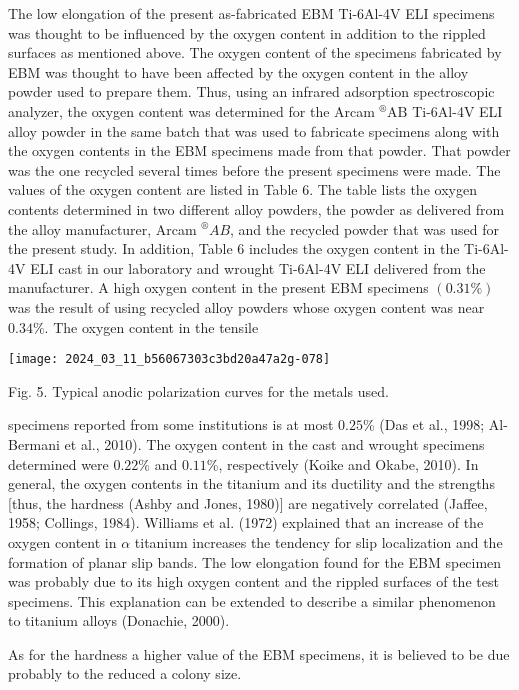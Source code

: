 \documentclass[10pt]{article}
\begin{document}
The low elongation of the present as-fabricated EBM Ti-6Al-4V ELI specimens was thought to be influenced by the oxygen content in addition to the rippled surfaces as mentioned above. The oxygen content of the specimens fabricated by EBM was thought to have been affected by the oxygen content in the alloy powder used to prepare them. Thus, using an infrared adsorption spectroscopic analyzer, the oxygen content was determined for the Arcam ${ }^{\circledR} \mathrm{AB}$ Ti-6Al-4V ELI alloy powder in the same batch that was used to fabricate specimens along with the oxygen contents in the EBM specimens made from that powder. That powder was the one recycled several times before the present specimens were made. The values of the oxygen content are listed in Table 6. The table lists the oxygen contents determined in two different alloy powders, the powder as delivered from the alloy manufacturer, Arcam ${ }^{\circledR} A B$, and the recycled powder that was used for the present study. In addition, Table 6 includes the oxygen content in the Ti-6Al-4V ELI cast in our laboratory and wrought Ti-6Al-4V ELI delivered from the manufacturer. A high oxygen content in the present EBM specimens $(0.31 \%)$ was the result of using recycled alloy powders whose oxygen content was near $0.34 \%$. The oxygen content in the tensile

\begin{center}
\texttt{[image: 2024\_03\_11\_b56067303c3bd20a47a2g-078]}
\end{center}

Fig. 5. Typical anodic polarization curves for the metals used.

specimens reported from some institutions is at most $0.25 \%$ (Das et al., 1998; Al-Bermani et al., 2010). The oxygen content in the cast and wrought specimens determined were $0.22 \%$ and $0.11 \%$, respectively (Koike and Okabe, 2010). In general, the oxygen contents in the titanium and its ductility and the strengths [thus, the hardness (Ashby and Jones, 1980)] are negatively correlated (Jaffee, 1958; Collings, 1984). Williams et al. (1972) explained that an increase of the oxygen content in $\alpha$ titanium increases the tendency for slip localization and the formation of planar slip bands. The low elongation found for the EBM specimen was probably due to its high oxygen content and the rippled surfaces of the test specimens. This explanation can be extended to describe a similar phenomenon to titanium alloys (Donachie, 2000).

As for the hardness a higher value of the EBM specimens, it is believed to be due probably to the reduced a colony size.
\end{document}
